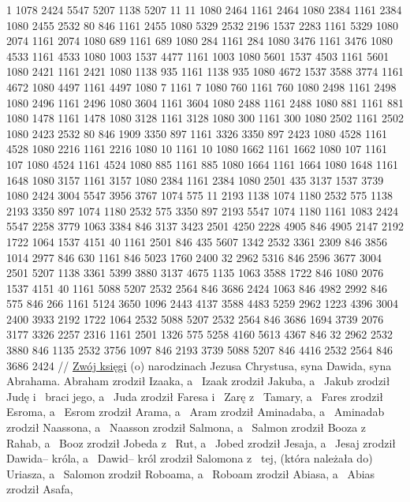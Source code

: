 \renewcommand{\chaptertitle}{Mateusza}
\begingl
\lettrine[loversize=1,lraise=-1.3]{1 }{}%
 {} 1078 2424 5547 5207 1138 5207 11
{} 11 1080 2464 1161 2464 1080 2384 1161 2384 1080 2455 2532 80 846
{} 1161 2455 1080 5329 2532 2196 1537 2283 1161 5329 1080 2074 1161 2074 1080 689
{} 1161 689 1080 284 1161 284 1080 3476 1161 3476 1080 4533
{} 1161 4533 1080 1003 1537 4477 1161 1003 1080 5601 1537 4503 1161 5601 1080 2421
{} 1161 2421 1080 1138 935 1161 1138 935 1080 4672 1537 3588 {} 3774
{} 1161 4672 1080 4497 1161 4497 1080 7 1161 7 1080 760
{} 1161 760 1080 2498 1161 2498 1080 2496 1161 2496 1080 3604
{} 1161 3604 1080 2488 1161 2488 1080 881 1161 881 1080 1478
{} 1161 1478 1080 3128 1161 3128 1080 300 1161 300 1080 2502
{} 1161 2502 1080 2423 2532 80 846 1909 3350 {} 897
{} 1161 3326 3350 {} 897 2423 1080 4528 1161 4528 1080 2216
{} 1161 2216 1080 10 1161 10 1080 1662 1161 1662 1080 107
{} 1161 107 1080 4524 1161 4524 1080 885 1161 885 1080 1664
{} 1161 1664 1080 1648 1161 1648 1080 3157 1161 3157 1080 2384
{} 1161 2384 1080 2501 435 3137 1537 3739 1080 2424 3004 5547
{} 3956 3767 1074 575 11 2193 1138 1074 1180 2532 575 1138 2193 3350 {} 897 1074 1180 2532 575 3350 {} 897 2193 5547 1074 1180
{} 1161 1083 2424 5547 2258 3779 1063 3384 846 3137 3423 2501 4250 2228 4905 846 4905 2147 2192 {} 1722 1064 1537 4151 40
{} 1161 2501 846 435 5607 1342 2532 3361 2309 846 3856 1014 2977 846 630
{} 1161 {} 846 5023 1760 2400 32 2962 5316 846 2596 3677 3004 2501 5207 1138 3361 5399 3880 {} 3137 4675 1135 1063 3588 1722 846 1080 2076 1537 4151 40
{} 1161 5088 5207 2532 2564 846 3686 2424 1063 846 4982 2992 846 575 846 266
{} 1161 5124 3650 1096 2443 4137 3588 4483 5259 2962 1223 4396 3004
{} 2400 3933 2192 1722 1064 2532 5088 5207 2532 2564 846 3686 1694 3739 2076 3177 3326 2257 2316
{} 1161 2501 1326 575 5258 4160 5613 4367 846 32 2962 2532 3880 846 1135
{} 2532 3756 1097 846 2193 3739 5088 5207 846 4416 2532 2564 846 3686 2424
//
\glb
 \underline{Zwój księgi} (o) narodzinach Jezusa Chrystusa, syna Dawida, syna Abrahama.
 Abraham zrodził Izaaka, a~ Izaak zrodził Jakuba, a~ Jakub zrodził Judę i~ braci jego,
 a~ Juda zrodził Faresa i~ Zarę z~ Tamary, a~ Fares zrodził Esroma, a~ Esrom zrodził Arama,
 a~ Aram zrodził Aminadaba, a~ Aminadab zrodził Naassona, a~ Naasson zrodził Salmona,
 a~ Salmon zrodził Booza z~ Rahab, a~ Booz zrodził Jobeda z~ Rut, a~ Jobed zrodził Jesaja,
 a~ Jesaj zrodził Dawida– króla, a~ Dawid– król zrodził Salomona z~ tej, (która należała do) Uriasza,
 a~ Salomon zrodził Roboama, a~ Roboam zrodził Abiasa, a~ Abias zrodził Asafa,
